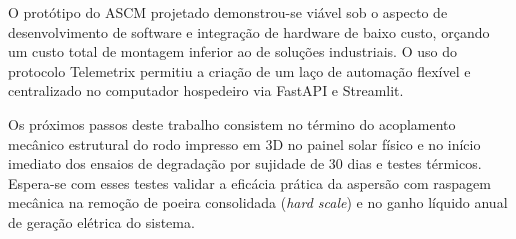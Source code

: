 \documentclass[12pt, a4paper]{article}
\begin{document}
O protótipo do ASCM projetado demonstrou-se viável sob o aspecto de desenvolvimento de software e integração de hardware de baixo custo, orçando um custo total de montagem inferior ao de soluções industriais. O uso do protocolo Telemetrix permitiu a criação de um laço de automação flexível e centralizado no computador hospedeiro via FastAPI e Streamlit.

Os próximos passos deste trabalho consistem no término do acoplamento mecânico estrutural do rodo impresso em 3D no painel solar físico e no início imediato dos ensaios de degradação por sujidade de 30 dias e testes térmicos. Espera-se com esses testes validar a eficácia prática da aspersão com raspagem mecânica na remoção de poeira consolidada (\textit{hard scale}) e no ganho líquido anual de geração elétrica do sistema.



\end{document}
